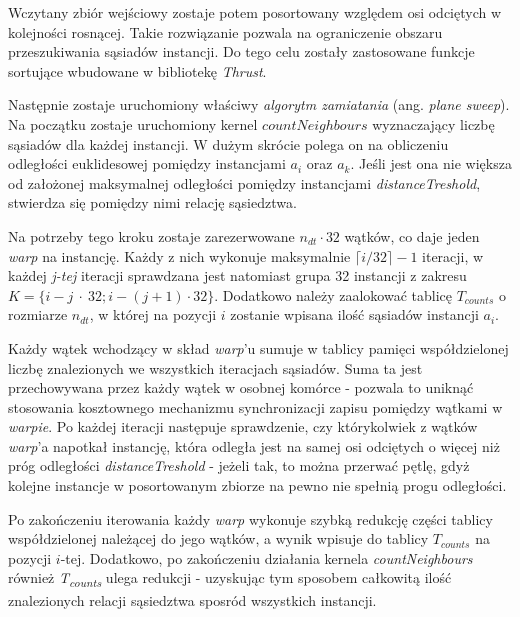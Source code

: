 \documentclass[12pt]{article}
\begin{document}
Wczytany zbiór wejściowy zostaje potem posortowany względem osi odciętych w kolejności rosnącej. Takie rozwiązanie pozwala na ograniczenie obszaru przeszukiwania sąsiadów instancji. Do tego celu zostały zastosowane funkcje sortujące wbudowane w bibliotekę \textit{Thrust}.

Następnie zostaje uruchomiony właściwy \textit{algorytm zamiatania} (ang. \textit{plane sweep}). Na początku zostaje uruchomiony kernel $ countNeighbours $ wyznaczający liczbę sąsiadów dla każdej instancji. W dużym skrócie polega on na obliczeniu odległości euklidesowej pomiędzy instancjami $ a_{i} $ oraz $ a_{k} $. Jeśli jest ona nie większa od założonej maksymalnej odległości pomiędzy instancjami \textit{distanceTreshold}, stwierdza się pomiędzy nimi relację sąsiedztwa.

Na potrzeby tego kroku zostaje zarezerwowane $ n_{dt} \cdot 32 $ wątków, co daje jeden \textit{warp} na instancję. Każdy z nich wykonuje maksymalnie $\lceil i / 32\rceil - 1$ iteracji, w każdej \textit{j-tej} iteracji sprawdzana jest natomiast grupa 32 instancji z zakresu $ K=\{i - j~\cdot~32; i - (j + 1) \cdot 32\} $. Dodatkowo należy zaalokować tablicę $ T_{counts} $ o rozmiarze $ n_{dt} $, w której na pozycji $ i $ zostanie wpisana ilość sąsiadów instancji $ a_{i} $.

Każdy wątek wchodzący w skład \textit{warp}'u sumuje w tablicy pamięci współdzielonej liczbę znalezionych we wszystkich iteracjach sąsiadów. Suma ta jest przechowywana przez każdy wątek w osobnej komórce - pozwala to uniknąć stosowania kosztownego mechanizmu synchronizacji zapisu pomiędzy wątkami w \textit{warpie}. Po każdej iteracji następuje sprawdzenie, czy którykolwiek z wątków \textit{warp}'a napotkał instancję, która odległa jest na samej osi odciętych o więcej niż próg odległości \textit{distanceTreshold} - jeżeli tak, to można przerwać pętlę, gdyż kolejne instancje w posortowanym zbiorze na pewno nie spełnią progu odległości.

Po zakończeniu iterowania każdy \textit{warp} wykonuje szybką redukcję części tablicy współdzielonej należącej do jego wątków, a wynik wpisuje do tablicy \textit{$ T_{counts} $} na pozycji $i$-tej. Dodatkowo, po zakończeniu działania kernela  \textit{countNeighbours} również \textit{T\textsubscript{counts}} ulega redukcji - uzyskując tym sposobem całkowitą ilość znalezionych relacji sąsiedztwa sposród wszystkich instancji.

\end{document}
